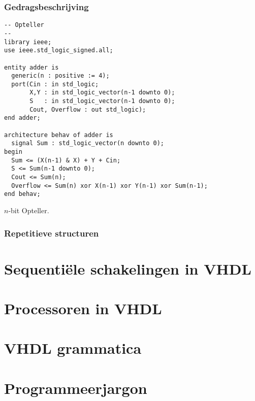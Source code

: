 \subsubsection{Gedragsbeschrijving}
\begin{vhdlcode}[hbt]
\centering
\begin{lstlisting}
-- Opteller
--
library ieee;
use ieee.std_logic_signed.all;

entity adder is
  generic(n : positive := 4);
  port(Cin : in std_logic;
       X,Y : in std_logic_vector(n-1 downto 0);
       S   : in std_logic_vector(n-1 downto 0);
       Cout, Overflow : out std_logic);
end adder;

architecture behav of adder is
  signal Sum : std_logic_vector(n downto 0);
begin
  Sum <= (X(n-1) & X) + Y + Cin;
  S <= Sum(n-1 downto 0);
  Cout <= Sum(n);
  Overflow <= Sum(n) xor X(n-1) xor Y(n-1) xor Sum(n-1);
end behav;
\end{lstlisting}
\caption{$n$-bit Opteller.}
\label{vhdl:adder}
\end{vhdlcode}
\subsubsection{Repetitieve structuren}
\section{Sequenti\"ele schakelingen in VHDL}
\section{Processoren in VHDL}
\section{VHDL grammatica}
\section{Programmeerjargon}
